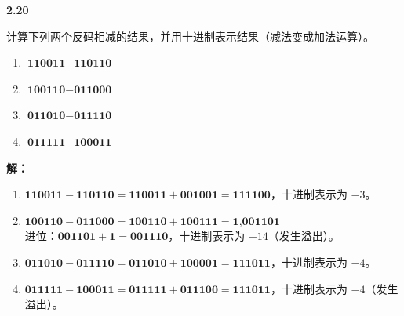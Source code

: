 \documentclass[10pt, a4paper]{article}
\newcommand{\question}[2]{
    \vspace{2ex}\noindent\textbf{#1}\ {\kaishu #2} \par\vspace{1ex}
}
\newcommand{\solution}[1]{
    \noindent\textbf{解：}{\songti #1} \par\vspace{3ex}
}
\begin{document}
\question{2.20}{
计算下列两个反码相减的结果，并用十进制表示结果（减法变成加法运算）。
\begin{enumerate}
    \item $ \textbf{110011}-\textbf{110110} $
    \item $ \textbf{100110}-\textbf{011000} $
    \item $ \textbf{011010}-\textbf{011110} $
    \item $ \textbf{011111}-\textbf{100011} $
\end{enumerate}
}

\solution{
\begin{enumerate}
    \item $ \textbf{110011} - \textbf{110110} = \textbf{110011} + \textbf{001001} = \textbf{111100}$，十进制表示为 $-3$。

    \item $ \textbf{100110} - \textbf{011000} = \textbf{100110} + \textbf{100111} = \textbf{1,001101}$ \\
    进位：$\textbf{001101} + \textbf{1} = \textbf{001110}$，十进制表示为 $+14$（发生溢出）。

    \item $ \textbf{011010} - \textbf{011110} = \textbf{011010} + \textbf{100001} = \textbf{111011}$，十进制表示为 $-4$。

    \item $ \textbf{011111} - \textbf{100011} = \textbf{011111} + \textbf{011100} = \textbf{111011}$，十进制表示为 $-4$（发生溢出）。
\end{enumerate}
}
\end{document}
